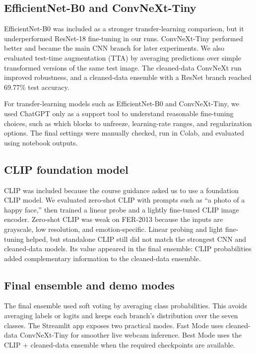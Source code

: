 \documentclass{article}
\begin{document}
\subsection{EfficientNet-B0 and ConvNeXt-Tiny}

EfficientNet-B0 \citep{tan2019efficientnet} was included as a stronger transfer-learning comparison, but it underperformed ResNet-18 fine-tuning in our runs. ConvNeXt-Tiny \citep{liu2022convnet} performed better and became the main CNN branch for later experiments. We also evaluated test-time augmentation (TTA) by averaging predictions over simple transformed versions of the same test image. The cleaned-data ConvNeXt run improved robustness, and a cleaned-data ensemble with a ResNet branch reached 69.77\% test accuracy.

For transfer-learning models such as EfficientNet-B0 and ConvNeXt-Tiny, we used ChatGPT only as a support tool to understand reasonable fine-tuning choices, such as which blocks to unfreeze, learning-rate ranges, and regularization options. The final settings were manually checked, run in Colab, and evaluated using notebook outputs.

\subsection{CLIP foundation model}

CLIP \citep{radford2021learning} was included because the course guidance asked us to use a foundation CLIP model. We evaluated zero-shot CLIP with prompts such as ``a photo of a happy face,'' then trained a linear probe and a lightly fine-tuned CLIP image encoder. Zero-shot CLIP was weak on FER-2013 because the inputs are grayscale, low resolution, and emotion-specific. Linear probing and light fine-tuning helped, but standalone CLIP still did not match the strongest CNN and cleaned-data models. Its value appeared in the final ensemble: CLIP probabilities added complementary information to the cleaned-data ensemble.

\subsection{Final ensemble and demo modes}

The final ensemble used soft voting by averaging class probabilities. This avoids averaging labels or logits and keeps each branch's distribution over the seven classes. The Streamlit app exposes two practical modes. Fast Mode uses cleaned-data ConvNeXt-Tiny for smoother live webcam inference. Best Mode uses the CLIP + cleaned-data ensemble when the required checkpoints are available.
\end{document}
